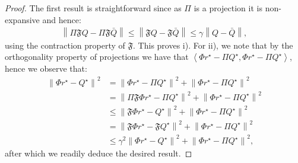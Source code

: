 \documentclass{article}
\begin{document}
\begin{proof}
The first result is straightforward since as $\Pi$ is a projection it is non-expansive and hence:
\begin{align*}
    \left\|\Pi \mathfrak{F}Q-\Pi \mathfrak{F}\bar{Q}\right\|\leq \left\| \mathfrak{F}Q-\mathfrak{F}\bar{Q}\right\|\leq \gamma \left\|Q-\bar{Q}\right\|,
\end{align*}
using the contraction property of $\mathfrak{F}$. This proves i). For ii), we note that by the orthogonality property of projections we have that $\left\langle\Phi r^\star - \Pi Q^\star,\Phi r^\star - \Pi Q^\star\right\rangle$, hence we observe that:
\begin{align*}
    \left\|\Phi r^\star - Q^\star\right\|^2&=\left\|\Phi r^\star - \Pi Q^\star\right\|^2+\left\|\Phi r^\star - \Pi Q^\star\right\|^2
\\&=\left\|\Pi \mathfrak{F}\Phi r^\star - \Pi Q^\star\right\|^2+\left\|\Phi r^\star - \Pi Q^\star\right\|^2
\\&\leq\left\|\mathfrak{F}\Phi r^\star -  Q^\star\right\|^2+\left\|\Phi r^\star - \Pi Q^\star\right\|^2
\\&=\left\|\mathfrak{F}\Phi r^\star -  \mathfrak{F}Q^\star\right\|^2+\left\|\Phi r^\star - \Pi Q^\star\right\|^2
\\&\leq\gamma^2\left\|\Phi r^\star -  Q^\star\right\|^2+\left\|\Phi r^\star - \Pi Q^\star\right\|^2,
\end{align*}
after which we readily deduce the desired result.
\end{proof}
\end{document}
